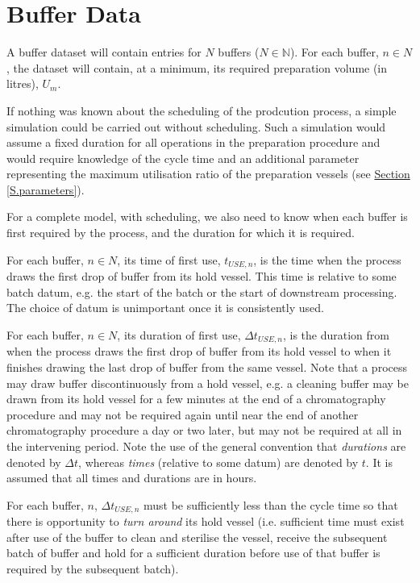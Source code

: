 \section{Buffer Data}\label{S.bufferdata}

A buffer dataset will contain entries for $N$ buffers ($N \in \mathbb{N}$).
For each buffer, $n \in N$, the dataset will contain, at a minimum, its
required preparation volume (in litres), $U_{m}$.

If nothing was known about the scheduling of the prodcution process, a simple
simulation could be carried out without scheduling.
Such a simulation would assume a fixed duration for all operations in the 
preparation procedure and would require knowledge of the cycle time and an
additional parameter representing the maximum utilisation ratio of the
preparation vessels (see \hyperref[S.parameters]{Section \ref*{S.parameters}}).

For a complete model, with scheduling, we also need to know when each buffer
is first required by the process, and the duration for which it is required.

For each buffer, $n \in N$, its time of first use, $t_{USE,n}$, is the time
when the process draws the first drop of buffer from its hold vessel.
This time is relative to some batch datum, e.g. the start of the batch or the
start of downstream processing.
The choice of datum is unimportant once it is consistently used.

For each buffer, $n \in N$, its duration of first use, $\Delta t_{USE,n}$, is
the duration from when the process draws the first drop of buffer from its hold
vessel to when it finishes drawing the last drop of buffer from the same
vessel.
Note that a process may draw buffer discontinuously from a hold vessel, e.g. a
cleaning buffer may be drawn from its hold vessel for a few minutes at the end
of a chromatography procedure and may not be required again until near the end
of another chromatography procedure a day or two later, but may not be required
at all in the intervening period.
Note the use of the general convention that \emph{durations} are denoted by
$\Delta t$, whereas \emph{times} (relative to some datum) are denoted by $t$.
It is assumed that all times and durations are in hours.

For each buffer, $n$, $\Delta t_{USE,n}$ must be sufficiently less than
the cycle time so that there is opportunity to \emph{turn around} its hold
vessel (i.e. sufficient time must exist after use of the buffer to clean and
sterilise the vessel, receive the subsequent batch of buffer and hold for a 
sufficient duration before use of that buffer is required by the subsequent
batch).

